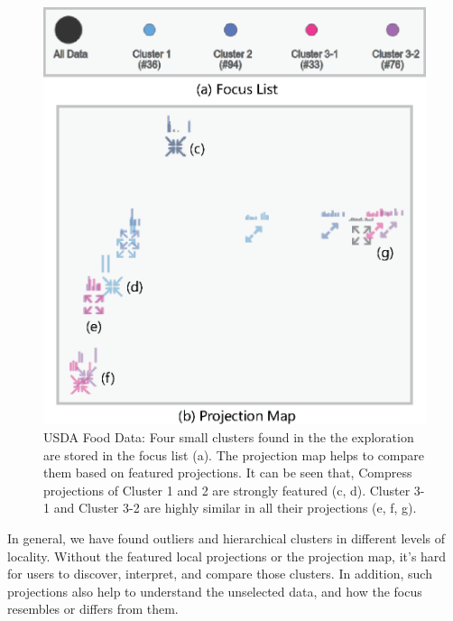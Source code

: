 \begin{figure}[htbp]
\centering
  \includegraphics[width=0.85\linewidth]{images/map_1.eps}%
  \caption{USDA Food Data: Four small clusters found in the the exploration are stored in the focus list (a). The projection map helps to compare them based on featured projections. It can be seen that, Compress projections of Cluster 1 and 2 are strongly featured (c, d). Cluster 3-1 and Cluster 3-2 are highly similar in all their projections (e, f, g).}
\label{fig:map}
  \end{figure}

 In general, we have found outliers and hierarchical clusters in different levels of locality. Without the featured local projections or the projection map, it's hard for users to discover, interpret, and compare those clusters. In addition, such projections also help to understand the unselected data, and how the focus resembles or differs from them.

